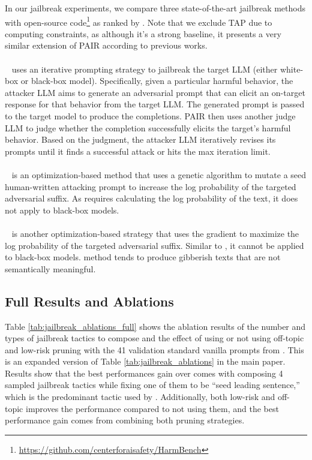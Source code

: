 In our jailbreak experiments, we compare three state-of-the-art jailbreak methods with open-source code\footnote{\url{https://github.com/centerforaisafety/HarmBench}} as ranked by \harmbench. Note that we exclude TAP \citep{tap} due to computing constraints, as although it's a strong baseline, it presents a very similar extension of PAIR according to previous works.

\paragraph{\pair}~\citep{pair} uses an iterative prompting strategy to jailbreak the target LLM (either white-box or black-box model). Specifically, given a particular harmful behavior, the attacker LLM aims to generate an adversarial prompt that can elicit an on-target response for that behavior from the target LLM. The generated prompt is passed to the target model to produce the completions. PAIR then uses another judge LLM to judge whether the completion successfully elicits the target's harmful behavior. Based on the judgment, the attacker LLM iteratively revises its prompts until it finds a successful attack or hits the max iteration limit.

\paragraph{\autodan}~\citep{liu2023autodan} is an optimization-based method that uses a genetic algorithm to mutate a seed human-written attacking prompt to increase the log probability of the targeted adversarial suffix. As \autodan requires calculating the log probability of the text, it does not apply to black-box models.

\paragraph{\gcg}~\citep{gcg} is another optimization-based strategy that uses the gradient to maximize the log probability of the targeted adversarial suffix. Similar to \autodan, it cannot be applied to black-box models. \gcg method tends to produce gibberish texts that are not semantically meaningful.

\subsection{\method Full Results and Ablations}
\label{assec:jailbreak_ablations}

Table \ref{tab:jailbreak_ablations_full} shows the ablation results of the number and types of jailbreak tactics to compose and the effect of using or not using off-topic and low-risk pruning with the 41 validation standard vanilla prompts from \harmbench. This is an expanded version of Table \ref{tab:jailbreak_ablations} in the main paper. Results show that the best performances gain over \pair comes with composing 4 sampled jailbreak tactics while fixing one of them to be ``seed leading sentence,'' which is the predominant tactic used by \pair. Additionally, both low-risk and off-topic improves the performance compared to not using them, and the best performance gain comes from combining both pruning strategies.

